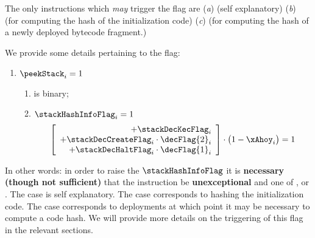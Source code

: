 The only instructions which \emph{may} trigger the \stackHashInfoFlag{} flag are
(\emph{a})  (self explanatory)
(\emph{b})  (for computing the  hash of the initialization code)
(\emph{c})  (for computing the  hash of a newly deployed bytecode fragment.)

We provide some details pertaining to the \stackHashInfoFlag{} flag: 
\begin{enumerate}[resume]
	\item \If $\peekStack_{i} = 1$ \Then
		\begin{enumerate}
			\item \stackHashInfoFlag{} is binary;
			\item \If $\stackHashInfoFlag_{i} = 1$ \Then
				\[
					\left[ \begin{array}{r}
						+ \stackDecKecFlag_{i}                                 \\
						+ \stackDecCreateFlag_{i}     \cdot \decFlag{2}_{i}    \\
						+ \stackDecHaltFlag_{i}       \cdot \decFlag{1}_{i}    \\
					\end{array} \right]
					\cdot \big(1 - \xAhoy_{i} \big)
					= 1
				\]
		\end{enumerate}
\end{enumerate}
\saNote{} 
In other words: in order to raise the $\stackHashInfoFlag$ it is \textbf{necessary (though not sufficient)} that the instruction be \textbf{unexceptional} and one of ,  or .
The  case is self explanatory.
The  case corresponds to hashing the initialization code.
The  case corresponds to deployments at which point it may be necessary to compute a code hash.
We will provide more details on the triggering of this flag in the relevant sections.
